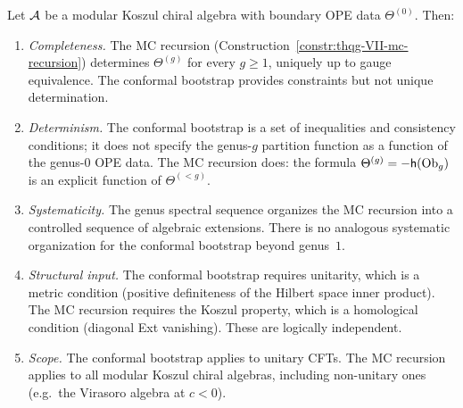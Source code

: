 \begin{theorem}
Let $\mathcal{A}$ be a modular Koszul chiral algebra with boundary OPE
data $\Theta^{(0)}$. Then:

\begin{enumerate}[label=\textup{(\roman*)}]
\item \emph{Completeness.} The MC recursion
 \textup{(}Construction~\textup{\ref{constr:thqg-VII-mc-recursion})}
 determines $\Theta^{(g)}$ for every $g \geq 1$, uniquely
 up to gauge equivalence. The conformal bootstrap provides
 constraints but not unique determination.

\item \emph{Determinism.} The conformal bootstrap is a
 set of inequalities and consistency conditions; it does not
 specify the genus-$g$ partition function as a function of
 the genus-$0$ OPE data. The MC recursion does: the
 formula $\Theta^{(g)} = -\mathsf{h}(\mathrm{Ob}_g)$ is an explicit
 function of $\Theta^{(<g)}$.

\item \emph{Systematicity.} The genus spectral sequence
 organizes the MC recursion into a controlled sequence of
 algebraic extensions. There is no analogous systematic
 organization for the conformal bootstrap beyond genus~$1$.

\item \emph{Structural input.} The conformal bootstrap
 requires unitarity, which is a metric condition (positive
 definiteness of the Hilbert space inner product). The MC
 recursion requires the Koszul property, which is a homological
 condition (diagonal Ext vanishing). These are logically
 independent.

\item \emph{Scope.} The conformal bootstrap applies to
 unitary CFTs. The MC recursion applies to all modular
 Koszul chiral algebras, including non-unitary ones
 \textup{(}e.g.\ the Virasoro algebra at $c < 0$\textup{)}.
\end{enumerate}
\end{theorem}

